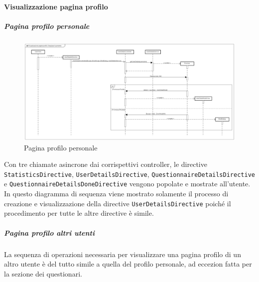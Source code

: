 \paragraph{Visualizzazione pagina profilo}

\subparagraph{Pagina profilo personale}

\label{Pagina profilo personale}

\begin{figure}[ht]
	\centering
	\includegraphics[scale=0.25,keepaspectratio]{UML/DiagrammiDiSequenza/Front-end/UserPage.png}
	\caption{Pagina profilo personale}
\end{figure} \FloatBarrier

Con tre chiamate asincrone dai corrispettivi controller, le directive \texttt{StatisticsDirective}, \texttt{UserDetailsDirective}, \texttt{QuestionnaireDetailsDirective} e \texttt{QuestionnaireDetailsDoneDirective} vengono popolate e mostrate all'utente. 
In questo diagramma di sequenza viene mostrato solamente il processo di creazione e visualizzazione della directive \texttt{UserDetailsDirective} poiché il procedimento per tutte le altre directive è simile.

\subparagraph{Pagina profilo altri utenti}

La sequenza di operazioni necessaria per visualizzare una pagina profilo di un altro utente è del tutto simile a quella del profilo personale, ad eccezion fatta per la sezione dei questionari. 
